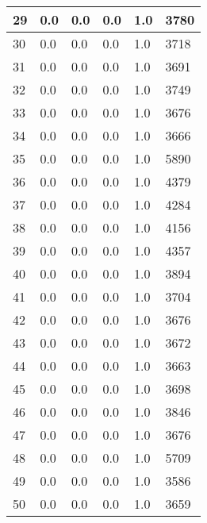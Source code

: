 \begin{longtable}{|l|l|l|l|l|l|}
29 & 0.0 & 0.0 & 0.0 & 1.0 & 3780 \\ \hline 
30 & 0.0 & 0.0 & 0.0 & 1.0 & 3718 \\ \hline 
31 & 0.0 & 0.0 & 0.0 & 1.0 & 3691 \\ \hline 
32 & 0.0 & 0.0 & 0.0 & 1.0 & 3749 \\ \hline 
33 & 0.0 & 0.0 & 0.0 & 1.0 & 3676 \\ \hline 
34 & 0.0 & 0.0 & 0.0 & 1.0 & 3666 \\ \hline 
35 & 0.0 & 0.0 & 0.0 & 1.0 & 5890 \\ \hline 
36 & 0.0 & 0.0 & 0.0 & 1.0 & 4379 \\ \hline 
37 & 0.0 & 0.0 & 0.0 & 1.0 & 4284 \\ \hline 
38 & 0.0 & 0.0 & 0.0 & 1.0 & 4156 \\ \hline 
39 & 0.0 & 0.0 & 0.0 & 1.0 & 4357 \\ \hline 
40 & 0.0 & 0.0 & 0.0 & 1.0 & 3894 \\ \hline 
41 & 0.0 & 0.0 & 0.0 & 1.0 & 3704 \\ \hline 
42 & 0.0 & 0.0 & 0.0 & 1.0 & 3676 \\ \hline 
43 & 0.0 & 0.0 & 0.0 & 1.0 & 3672 \\ \hline 
44 & 0.0 & 0.0 & 0.0 & 1.0 & 3663 \\ \hline 
45 & 0.0 & 0.0 & 0.0 & 1.0 & 3698 \\ \hline 
46 & 0.0 & 0.0 & 0.0 & 1.0 & 3846 \\ \hline 
47 & 0.0 & 0.0 & 0.0 & 1.0 & 3676 \\ \hline 
48 & 0.0 & 0.0 & 0.0 & 1.0 & 5709 \\ \hline 
49 & 0.0 & 0.0 & 0.0 & 1.0 & 3586 \\ \hline 
50 & 0.0 & 0.0 & 0.0 & 1.0 & 3659 \\ \hline 
\end{longtable}